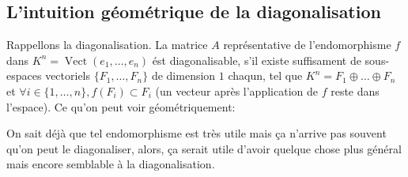 \subsection{L'intuition géométrique de la diagonalisation}
Rappellons la diagonalisation. La matrice $A$ représentative de l'endomorphisme  $f$ dans $K^n = \operatorname{Vect}(e_1, \ldots, e_n)$ ést diagonalisable, s'il existe suffisament de sous-espaces vectoriels $\{F_1, \ldots, F_n\}$ de dimension $1$ chaqun, tel que  $K^n = F_1 \oplus \ldots \oplus F_n$ et $\forall i \in \{1, \ldots, n\}, f(F_i) \subset F_i$ (un vecteur après l'application de $f$ reste dans l'espace). Ce qu'on peut voir géométriquement:
\begin{center}
\end{center}
On sait déjà que tel endomorphisme est très utile mais ça n'arrive pas souvent qu'on peut le diagonaliser, alors, ça serait utile d'avoir quelque chose plus général mais encore semblable à la diagonalisation.
